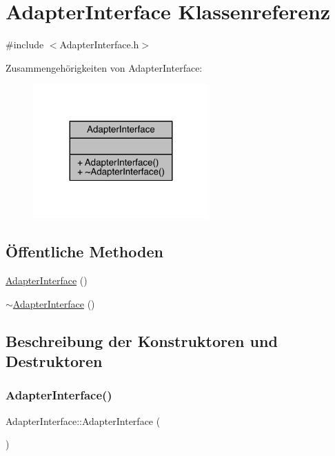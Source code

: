 \hypertarget{class_adapter_interface}{}\section{Adapter\+Interface Klassenreferenz}
\label{class_adapter_interface}


{\ttfamily \#include $<$Adapter\+Interface.\+h$>$}



Zusammengehörigkeiten von Adapter\+Interface\+:\nopagebreak
\begin{figure}[H]
\begin{center}
\leavevmode
\includegraphics[width=191pt]{class_adapter_interface__coll__graph}
\end{center}
\end{figure}
\subsection*{Öffentliche Methoden}
\begin{DoxyCompactItemize}
\item 
\hyperlink{class_adapter_interface_a9e247d78e84be9d3cb3c3a2dfc93dc6e}{Adapter\+Interface} ()
\item 
\hyperlink{class_adapter_interface_a1b1ab479bdaba7c80831d7bb950be7f5}{$\sim$\+Adapter\+Interface} ()
\end{DoxyCompactItemize}


\subsection{Beschreibung der Konstruktoren und Destruktoren}
\hypertarget{class_adapter_interface_a9e247d78e84be9d3cb3c3a2dfc93dc6e}{}\label{class_adapter_interface_a9e247d78e84be9d3cb3c3a2dfc93dc6e} 
\subsubsection{\texorpdfstring{Adapter\+Interface()}{AdapterInterface()}}
{\footnotesize\ttfamily Adapter\+Interface\+::\+Adapter\+Interface (\begin{DoxyParamCaption}{ }\end{DoxyParamCaption})}

